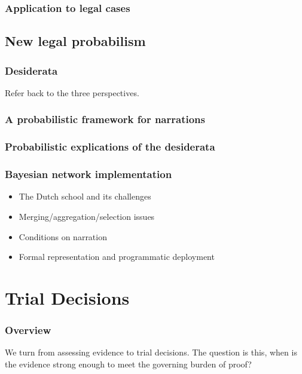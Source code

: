\documentclass[]{book}
\begin{document}
\section{Application to legal cases}

\chapter{New legal probabilism}

\section{Desiderata}

Refer back to the three perspectives.

\section{A probabilistic framework for narrations}

\section{Probabilistic explications of the desiderata}

\section{Bayesian network implementation}


\begin{itemize}
\item
  The Dutch school and its challenges
\item
  Merging/aggregation/selection issues
\item
  Conditions on narration
\item
  Formal representation and programmatic deployment
\end{itemize}

\part{Trial Decisions}

\section*{Overview}

We turn from assessing evidence to trial decisions. The question is
this, when is the evidence strong enough to meet the governing burden of
proof?
\end{document}
